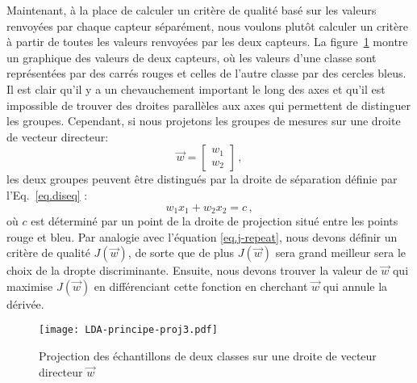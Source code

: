 Maintenant, à la place de calculer un critère de qualité basé sur les valeurs renvoyées par chaque capteur séparément, nous voulons plutôt calculer un critère à partir de toutes les valeurs renvoyées par les deux capteurs. La figure~\ref{fig.lda-proj} montre un graphique des valeurs de deux capteurs, où les valeurs d'une classe sont représentées par des carrés rouges et celles de l'autre classe par des cercles bleus. Il est clair qu'il y a un chevauchement important le long des axes et qu'il est impossible de trouver des droites parallèles aux axes qui permettent de distinguer les groupes. Cependant, si nous projetons les groupes de mesures sur une droite de vecteur directeur:
\[
\vec{w} = \left[\begin{array}{c}w_1\\w_2\end{array}\right]\,,
\]
les deux groupes peuvent être distingués par la droite de séparation définie par l'Eq.~\ref{eq.diseq} :
\[
w_1x_1 + w_2x_2 = c\,,
\]
où $c$ est déterminé par un point de la droite de projection situé entre les points rouge et bleu. Par analogie avec l'équation \ref{eq.j-repeat}, nous devons définir un critère de qualité $J(\vec{w})$, de sorte que de plus $J(\vec{w})$ sera grand meilleur sera le choix de la dropte discriminante. Ensuite, nous devons trouver la valeur de $\vec{w}$ qui maximise $J(\vec{w})$ en différenciant cette fonction en cherchant $\vec{w}$ qui annule la dérivée.

\begin{figure}
\begin{center}
\texttt{[image: LDA-principe-proj3.pdf]}
\end{center}
\caption{Projection des échantillons de deux classes sur une droite de vecteur directeur $\vec{w}$}\label{fig.lda-proj}
\end{figure}


